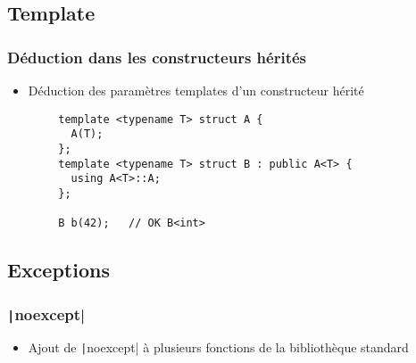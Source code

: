 \documentclass[C++.tex]{subfiles}
\begin{document}
\subsection*{Template}
\begin{frame}[fragile]
	\frametitle{Déduction dans les constructeurs hérités}
	\begin{itemize}
		\item Déduction des paramètres templates d'un constructeur hérité
	\end{itemize}

	\begin{verbatim}
		template <typename T> struct A {
		  A(T);
		};
		template <typename T> struct B : public A<T> {
		  using A<T>::A;
		};

		B b(42);   // OK B<int>
	\end{verbatim}


\end{frame}

\subsection*{Exceptions}
\begin{frame}[fragile]
	\frametitle{\texttt|noexcept|}
	\begin{itemize}
		\item Ajout de \texttt|noexcept| à plusieurs fonctions de la bibliothèque standard
	\end{itemize}
\end{frame}
\end{document}
